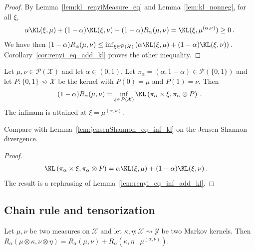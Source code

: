 \begin{proof}
By Lemma~\ref{lem:kl_renyiMeasure_eq} and Lemma~\ref{lem:kl_nonneg}, for all $\xi$,
\begin{align*}
\alpha \KL(\xi, \mu) + (1 - \alpha)\KL(\xi, \nu) - (1 - \alpha) R_\alpha(\mu, \nu)
= \KL(\xi, \mu^{(\alpha, \nu)})
\ge 0 \: .
\end{align*}
We have then $(1 - \alpha) R_\alpha(\mu, \nu) \le \inf_{\xi \in \mathcal P(\mathcal X)}\left( \alpha \KL(\xi, \mu) + (1 - \alpha)\KL(\xi, \nu) \right)$.
Corollary~\ref{cor:renyi_eq_add_kl} proves the other inequality.
\end{proof}


\begin{lemma}
  \label{lem:renyi_eq_inf_kl}
  Let $\mu, \nu \in \mathcal P(\mathcal X)$ and let $\alpha \in (0, 1)$. Let $\pi_\alpha = (\alpha, 1 - \alpha) \in \mathcal P(\{0,1\})$ and let $P : \{0,1\} \rightsquigarrow \mathcal X$ be the kernel with $P(0) = \mu$ and $P(1) = \nu$. Then
  \begin{align*}
  (1 - \alpha) R_\alpha(\mu, \nu) = \inf_{\xi \in \mathcal P(\mathcal X)} \KL\left( \pi_\alpha \times \xi, \pi_\alpha \otimes P \right) \: .
  \end{align*}
  The infimum is attained at $\xi = \mu^{(\alpha, \nu)}$.
\end{lemma}

Compare with Lemma~\ref{lem:jensenShannon_eq_inf_kl} on the Jensen-Shannon divergence.

\begin{proof}%
{}
\begin{align*}
\KL\left( \pi_\alpha \times \xi, \pi_\alpha \otimes P \right)
&= \alpha \KL(\xi, \mu) + (1 - \alpha) \KL(\xi, \nu)
\: .
\end{align*}
The result is a rephrasing of Lemma~\ref{lem:renyi_eq_inf_add_kl}.
\end{proof}



\subsection{Chain rule and tensorization}

\begin{theorem}
  \label{thm:renyi_chain_rule}
  Let $\mu, \nu$ be two measures on $\mathcal X$ and let $\kappa, \eta : \mathcal X \rightsquigarrow \mathcal Y$ be two Markov kernels.
  Then $R_\alpha(\mu \otimes \kappa, \nu \otimes \eta) = R_\alpha(\mu, \nu) + R_\alpha(\kappa, \eta \mid \mu^{(\alpha, \nu)})$.
\end{theorem}

